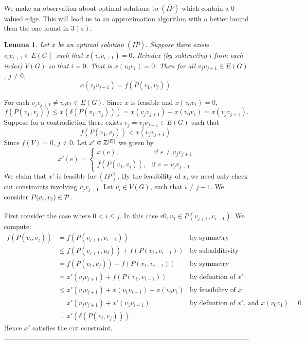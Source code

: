 \documentclass[letterpaper,12pt,oneside,onecolumn]{article}
\newenvironment{proof}{{\bf Proof:  }}{\hfill\rule{2mm}{2mm}}
\newtheorem{lemma}[fact]{Lemma}
\begin{document}
\paragraph{}
We make an observation about optimal solutions to $(\overline{IP})$ which contain a $0$-valued edge. This will lead us to an approximation algorithm with a better bound than the one found in $3(a)$.
\begin{lemma}\label{lemma:0edge}
Let $x$ be an optimal solution $(\bar{IP})$. Suppose there exists $v_iv_{i+1} \in E(G)$ such that $x(v_iv_{i+1}) = 0$. Reindex (by subtracting $i$ from each index) $V(G)$ so that $i = 0$. That is $x(v_0v_1)= 0$. Then for all $v_jv_{j+1} \in E(G)$, $j \neq 0$,
$$x(v_jv_{j+1}) = f(P(v_1, v_j)).$$
\end{lemma}
\begin{proof}
For each $v_jv_{j+1} \neq v_0v_{1} \in E(G)$. Since $x$ is feasible and $x(v_0v_{1}) = 0$,
$$f(P(v_1, v_j)) \leq x(\delta(P(v_1,v_j))) = x(v_jv_{j+1}) + x(v_0v_{1}) = x(v_jv_{j+1}).$$
Suppose for a contradiction there exists $e_j = v_{j}v_{j+1} \in E(G)$ such that
$$f(P(v_1,v_j)) < x(v_jv_{j+1}).$$
Since $f(V) = 0$, $j\neq 0$. Let $x' \in \mathbb{Z}^{|E|}$ we given by
$$x'(e) = \begin{cases}
x(e), &\text{ if $e\neq v_jv_{j+1}$} \\
f(P(v_1,v_{j})), &\text{if $e=v_jv_{j+1}$}. 
\end{cases}$$
We claim that $x'$ is feasible for $(\overline{IP})$. By the feasibility of $x$, we need only check cut constraints involving $v_jv_{j+1}$. Let $v_i \in V(G)$, such that $i \neq j-1$. We consider $P(v_i,v_j)\in \mathcal{P}$.
\paragraph{}
First consider the case where $0 < i \leq j$. In this case $v0,v_1 \in P(v_{j+1}, v_{i-1})$. We compute:
\begin{align*}
f(P(v_i,v_j)) &= f(P(v_{j+1}, v_{i-1})) &\text{by symmetry} \\
&\leq f(P(v_{j+1}, v_0)) + f(P(v_{1},v_{i-1})) &\text{by subadditivity} \\
&= f(P(v_1, v_j)) + f(P(v_1, v_{i-1})) &\text{by symmetry} \\
&= x'(v_jv_{j+1}) + f(P(v_1, v_{i-1})) &\text{by definition of $x'$} \\
&\leq x'(v_jv_{j+1}) + x(v_1v_{i-1}) +x(v_0v_1) &\text{by feasibility of $x$} \\
&= x'(v_jv_{j+1}) + x'(v_1v_{i-1}) &\text{by definition of $x'$, and $x(v_0v_1)=0$} \\
&=x'(\delta(P(v_i,v_j))).
\end{align*}
Hence $x'$ satisfies the cut constraint.

\end{proof}
\end{document}
